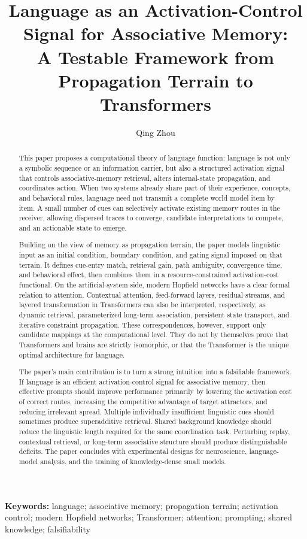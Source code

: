 \documentclass[11pt, a4paper]{article}
\title{\textbf{Language as an Activation-Control Signal for Associative Memory: \\ A Testable Framework from Propagation Terrain to Transformers}}
\author{Qing Zhou}\date{}
\begin{document}
\maketitle


\begin{abstract}


This paper proposes a computational theory of language function: language is not only a symbolic sequence or an information carrier, but also a structured activation signal that controls associative-memory retrieval, alters internal-state propagation, and coordinates action. When two systems already share part of their experience, concepts, and behavioral rules, language need not transmit a complete world model item by item. A small number of cues can selectively activate existing memory routes in the receiver, allowing dispersed traces to converge, candidate interpretations to compete, and an actionable state to emerge.


Building on the view of memory as propagation terrain, the paper models linguistic input as an initial condition, boundary condition, and gating signal imposed on that terrain. It defines cue-entry match, retrieval gain, path ambiguity, convergence time, and behavioral effect, then combines them in a resource-constrained activation-cost functional. On the artificial-system side, modern Hopfield networks have a clear formal relation to attention. Contextual attention, feed-forward layers, residual streams, and layered transformation in Transformers can also be interpreted, respectively, as dynamic retrieval, parameterized long-term association, persistent state transport, and iterative constraint propagation. These correspondences, however, support only candidate mappings at the computational level. They do not by themselves prove that Transformers and brains are strictly isomorphic, or that the Transformer is the unique optimal architecture for language.


The paper's main contribution is to turn a strong intuition into a falsifiable framework. If language is an efficient activation-control signal for associative memory, then effective prompts should improve performance primarily by lowering the activation cost of correct routes, increasing the competitive advantage of target attractors, and reducing irrelevant spread. Multiple individually insufficient linguistic cues should sometimes produce superadditive retrieval. Shared background knowledge should reduce the linguistic length required for the same coordination task. Perturbing replay, contextual retrieval, or long-term associative structure should produce distinguishable deficits. The paper concludes with experimental designs for neuroscience, language-model analysis, and the training of knowledge-dense small models.


\end{abstract}
\textbf{Keywords:} language; associative memory; propagation terrain; activation control; modern Hopfield networks; Transformer; attention; prompting; shared knowledge; falsifiability
\end{document}

